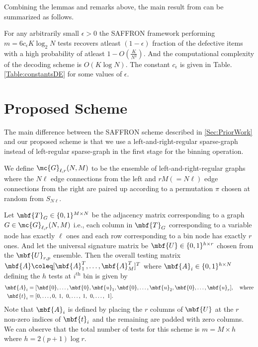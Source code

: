\documentclass[conference,,twocolumn]{IEEEtran}
\def\ceps{c_{\epsilon}}
\begin{document}
Combining the lemmas and remarks above, the main result from \cite{lee2015saffron} can be summarized as follows.
\begin{theorem}
For any arbitrarily small $\epsilon>0$ the SAFFRON framework performing $m=6\ceps K \log_{2}N$ tests recovers atleast $(1-\epsilon)$ fraction of the defective items with a high probability of atleast $1-O(\frac{K}{N^2})$. And the computational complexity of the decoding scheme is $O(K\log N)$. The constant $\ceps$ is given in Table. \ref{Table:constantsDE} for some values of $\epsilon$.
\end{theorem}

\section{Proposed Scheme}
The main difference between the SAFFRON scheme described in \ref{Sec:PriorWork} and our proposed scheme is that we use a left-and-right-regular sparse-graph instead of left-regular sparse-graph in the first stage for the binning operation.

\begin{definition}
We define $\mc{G}_{\ell,r}(N,M)$ to be the ensemble of left-and-right-regular graphs where the $N\ell$ edge connections from the left and $rM(=N\ell)$ edge connections from the right are paired up according to a permutation $\pi$ chosen at random from $S_{N\ell}$. 
\end{definition}

 Let $\mbf{T}_{G}\in\{0,1\}^{M\times N }$ be the adjacency matrix corresponding to a graph $G\in\mc{G}_{\ell,r}(N,M)$ i.e., each column in $\mbf{T}_{G}$ corresponding to a variable node has exactly $\ell$ ones and each row corresponding to a bin node has exactly $r$ ones. And let the universal signature matrix be $\mbf{U}\in\{0,1\}^{h \times r}$ chosen from the $\mbf{U}_{r,p}$ ensemble. Then the overall testing matrix $\mbf{A}\coleq [\mbf{A}_{1}^{T},\ldots,\mbf{A}_{M}^{T}]^T$ where $\mbf{A}_{i}\in\{0,1\}^{h\times N}$ defining the $h$ tests at $i^{\text{th}}$ bin is given by
 \begin{align}
 \mbf{A}_i&=[\mbf{0},\ldots,\mbf{0},\mbf{u}_1, \mbf{0},\ldots, \mbf{u}_2,\mbf{0}, \ldots, \mbf{u}_{r}],\quad \text{where}\label{Eqn:TestingMatrixDefn}\\
\mbf{t}_i &= [0,\ldots,0,\hspace{0.6ex}1,\hspace{0.9ex} 0, \ldots,\hspace{0.6ex}1,\hspace{0.9ex}0, \ldots, \hspace{0.9ex}1].\nonumber
 \end{align}
Note that $\mbf{A}_i$ is defined by placing the $r$ columns of $\mbf{U}$ at the $r$ non-zero indices of $\mbf{t}_i$ and the remaining are padded with zero columns. We can observe that the total number of tests for this scheme is $m=M\times h$ where $h=2(p+1)\log r$.
\end{document}
